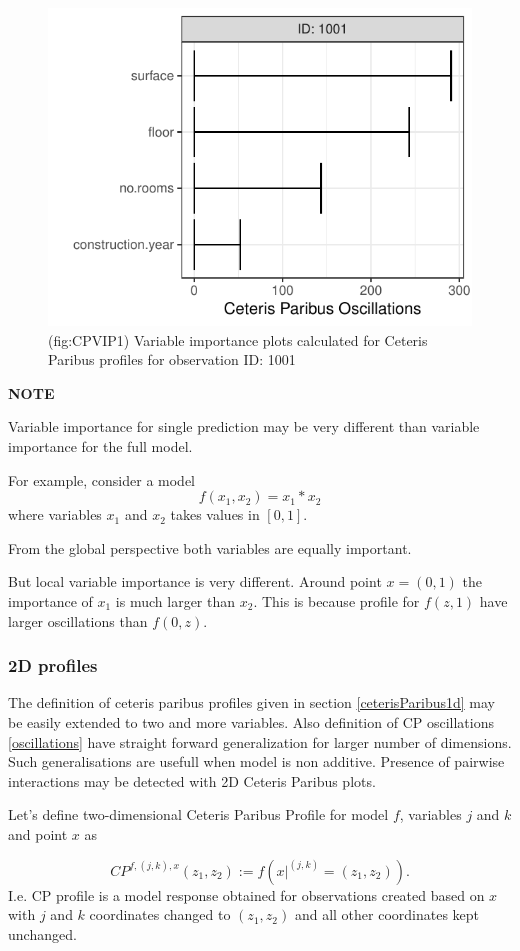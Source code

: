 \documentclass[]{krantz}
\theoremstyle{definition}
\theoremstyle{definition}
\theoremstyle{definition}
\theoremstyle{remark}
\begin{document}
\begin{figure}

{\centering \includegraphics[width=0.4\linewidth]{figure/cp_vip_1} 

}

\caption{(fig:CPVIP1) Variable importance plots calculated for Ceteris Paribus profiles for observation ID: 1001}\label{fig:CPVIP1}
\end{figure}

\textbf{NOTE}

Variable importance for single prediction may be very different than
variable importance for the full model.

For example, consider a model \[
f(x_1, x_2) = x_1 * x_2
\] where variables \(x_1\) and \(x_2\) takes values in \([0,1]\).

From the global perspective both variables are equally important.

But local variable importance is very different. Around point
\(x = (0, 1)\) the importance of \(x_1\) is much larger than \(x_2\).
This is because profile for \(f(z, 1)\) have larger oscillations than
\(f(0, z)\).

\hypertarget{d-profiles}{%
\subsubsection{2D profiles}\label{d-profiles}}

The definition of ceteris paribus profiles given in section
\ref{ceterisParibus1d} may be easily extended to two and more variables.
Also definition of CP oscillations \ref{oscillations} have straight
forward generalization for larger number of dimensions. Such
generalisations are usefull when model is non additive. Presence of
pairwise interactions may be detected with 2D Ceteris Paribus plots.

Let's define two-dimensional Ceteris Paribus Profile for model \(f\),
variables \(j\) and \(k\) and point \(x\) as

\[
CP^{f, (j,k), x}(z_1, z_2) := f(x|^{(j,k)} = (z_1,z_2)).
\] I.e. CP profile is a model response obtained for observations created
based on \(x\) with \(j\) and \(k\) coordinates changed to
\((z_1, z_2)\) and all other coordinates kept unchanged.
\end{document}
